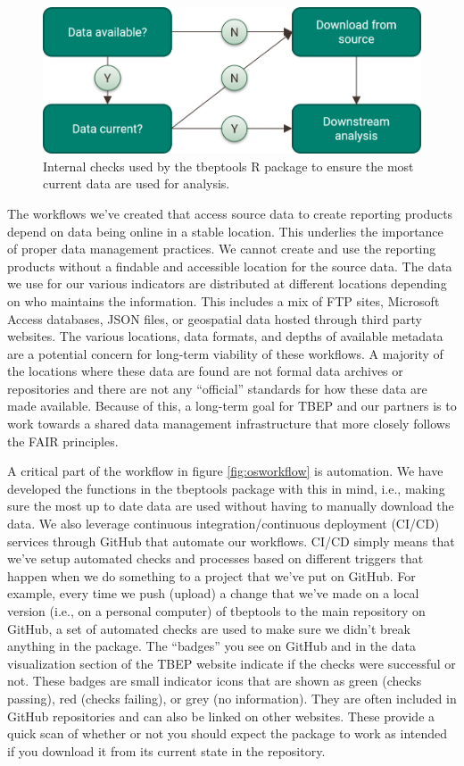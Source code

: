 \documentclass[
]{book}
\begin{document}
\begin{figure}

{\centering \includegraphics[width=0.8\linewidth]{img/readchk} 

}

\caption{Internal checks used by the tbeptools R package to ensure the most current data are used for analysis.}\label{fig:readchk}
\end{figure}

The workflows we've created that access source data to create reporting products depend on data being online in a stable location. This underlies the importance of proper data management practices. We cannot create and use the reporting products without a findable and accessible location for the source data. The data we use for our various indicators are distributed at different locations depending on who maintains the information. This includes a mix of FTP sites, Microsoft Access databases, JSON files, or geospatial data hosted through third party websites. The various locations, data formats, and depths of available metadata are a potential concern for long-term viability of these workflows. A majority of the locations where these data are found are not formal data archives or repositories and there are not any ``official'' standards for how these data are made available. Because of this, a long-term goal for TBEP and our partners is to work towards a shared data management infrastructure that more closely follows the FAIR principles.

A critical part of the workflow in figure \ref{fig:osworkflow} is automation. We have developed the functions in the tbeptools package with this in mind, i.e., making sure the most up to date data are used without having to manually download the data. We also leverage continuous integration/continuous deployment (CI/CD) services through GitHub that automate our workflows. CI/CD simply means that we've setup automated checks and processes based on different triggers that happen when we do something to a project that we've put on GitHub. For example, every time we push (upload) a change that we've made on a local version (i.e., on a personal computer) of tbeptools to the main repository on GitHub, a set of automated checks are used to make sure we didn't break anything in the package. The ``badges'' you see on GitHub and in the data visualization section of the TBEP website indicate if the checks were successful or not. These badges are small indicator icons that are shown as green (checks passing), red (checks failing), or grey (no information). They are often included in GitHub repositories and can also be linked on other websites. These provide a quick scan of whether or not you should expect the package to work as intended if you download it from its current state in the repository.
\end{document}
